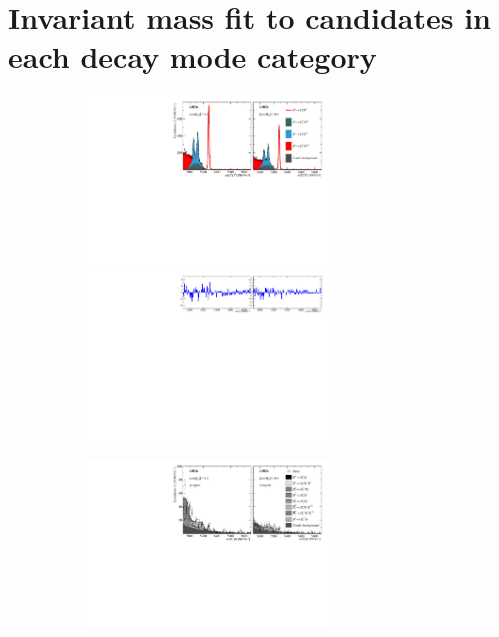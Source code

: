 \chapter{Invariant mass fit to \decay{\Bp}{\Dsp\phiz} candidates in each \Dsp decay mode category}




\begin{figure}[!h]
    \centering
    \begin{subfigure}[t]{1.0\textwidth}
        \centering
        \includegraphics[width=0.7\textwidth]{figs/Appendix_FitCategories/canvas_DsD0_merged_both_summed_splitHel_splitKKPi_s21_s21r1_s24_s26.pdf}\\
        \includegraphics[width=0.7\textwidth]{figs/Appendix_FitCategories/residuals_DsD0_merged_both_summed_splitHel_splitKKPi_s21_s21r1_s24_s26.pdf}
    \end{subfigure}
    \begin{subfigure}[t]{1.0\textwidth}
        \centering
        \includegraphics[width=0.7\textwidth]{figs/Appendix_FitCategories/canvas_DsPhi_merged_both_summed_splitHel_splitKKPi_s21_s21r1_s24_s26.pdf}\\

\end{subfigure}
\end{figure}
